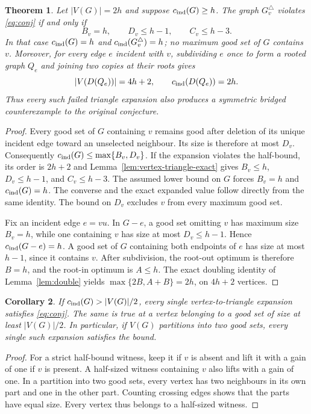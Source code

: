 \documentclass[11pt]{article}
\newtheorem{theorem}{Theorem}[section]
\newtheorem{corollary}[theorem]{Corollary}
\begin{document}
\begin{theorem}\label{thm:vertex-triangle-obstruction}
Let $|V(G)|=2h$ and suppose $c_{\rm ind}(G)\geq h$.
The graph $G^\triangle_v$ violates \eqref{eq:conj} if and only if
\[
 B_v=h,\qquad D_v\leq h-1,\qquad C_v\leq h-3.
\]
In that case $c_{\rm ind}(G)=h$ and
$c_{\rm ind}(G^\triangle_v)=h$; no maximum good set of $G$ contains
$v$. Moreover, for every edge $e$ incident with $v$, subdividing $e$
once to form a rooted graph $Q_e$ and joining two copies at their
roots gives
\[
 |V(D(Q_e))|=4h+2,\qquad c_{\rm ind}(D(Q_e))=2h.
\]
Thus every such failed triangle expansion also produces a symmetric
bridged counterexample to the original conjecture.
\end{theorem}
\begin{proof}
Every good set of $G$ containing $v$ remains good after deletion of
its unique incident edge toward an unselected neighbour. Its size
is therefore at most $D_v$. Consequently
$c_{\rm ind}(G)\leq\max\{B_v,D_v\}$.
If the expansion violates the half-bound, its order is $2h+2$ and
Lemma~\ref{lem:vertex-triangle-exact} gives
$B_v\leq h$, $D_v\leq h-1$, and $C_v\leq h-3$.
The assumed lower bound on $G$ forces $B_v=h$ and
$c_{\rm ind}(G)=h$. The converse and the exact expanded value follow
directly from the same identity. The bound on $D_v$ excludes $v$
from every maximum good set.

Fix an incident edge $e=vu$. In $G-e$, a good set omitting $v$ has
maximum size $B_v=h$, while one containing $v$ has size at most
$D_v\leq h-1$. Hence $c_{\rm ind}(G-e)=h$. A good set of $G$
containing both endpoints of $e$ has size at most $h-1$, since it
contains $v$. After subdivision, the root-out optimum is therefore
$B=h$, and the root-in optimum is $A\leq h$. The exact doubling
identity of Lemma~\ref{lem:double} yields
$\max\{2B,A+B\}=2h$, on $4h+2$ vertices.
\end{proof}

\begin{corollary}\label{cor:triangle-covered}
If $c_{\rm ind}(G)>|V(G)|/2$, every single vertex-to-triangle
expansion satisfies \eqref{eq:conj}. The same is true at a vertex
belonging to a good set of size at least $|V(G)|/2$. In particular,
if $V(G)$ partitions into two good sets, every single such expansion
satisfies the bound.
\end{corollary}
\begin{proof}
For a strict half-bound witness, keep it if $v$ is absent and lift it
with a gain of one if $v$ is present. A half-sized witness containing
$v$ also lifts with a gain of one. In a partition into two good sets,
every vertex has two neighbours in its own part and one in the other
part. Counting crossing edges shows that the parts have equal size.
Every vertex thus belongs to a half-sized witness.
\end{proof}
\end{document}
